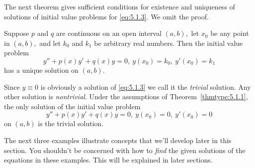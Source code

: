 \documentclass{ximera}
\begin{document}
The next theorem gives sufficient conditions for existence and
uniqueness of solutions of initial value problems for \eqref{eq:5.1.3}. We
omit the proof.
 
\begin{theorem} \label{thmtype:5.1.1}
Suppose $p$ and $q$ are continuous on an open interval $(a,b),$
let $x_0$ be any point in $(a,b),$ and let $k_0$ and $k_1$ be
arbitrary real numbers. Then the initial value problem
$$
y''+p(x)y'+q(x)y=0,\ y(x_0)=k_0,\ y'(x_0)=k_1
$$
 has a unique solution  on $(a,b)$.
\end{theorem}
 
Since $y\equiv0$ is obviously a solution of \eqref{eq:5.1.3} we call it
the \textit{trivial} solution. Any other solution is \textit{nontrivial}.
Under the assumptions of Theorem~\ref{thmtype:5.1.1}, the only solution of
the initial value problem
$$
y''+p(x)y'+q(x)y=0,\ y(x_0)=0,\ y'(x_0)=0
$$
on  $(a,b)$ is the trivial solution.
 
The next three examples illustrate concepts that we'll develop later
in this section. You shouldn't be concerned with how to \textit{find}
the given solutions of the equations in these examples. This will be
explained in later sections.
 
\end{document}
